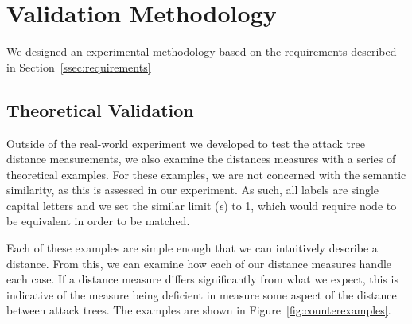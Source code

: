 \section{Validation Methodology}
\label{sec:methodology}

We designed an experimental methodology based on the requirements described in Section~\ref{ssec:requirements}





\subsection{Theoretical Validation}
\label{ssec:methodology-examples}


Outside of the real-world experiment we developed to test the attack tree distance measurements, we also examine the distances measures with a series of theoretical examples. For these examples, we are not concerned with the semantic similarity,  as this is assessed in our experiment. As such, all labels are single capital letters and we set the similar limit ($\epsilon$) to 1, which would require node to be equivalent in order to be matched.

Each of these examples are simple enough that we can intuitively describe a distance. From this, we can examine how each of our distance measures handle each case. If a distance measure differs significantly from what we expect, this is indicative of the measure being deficient in measure some aspect of the distance between attack trees. The examples are shown in Figure~\ref{fig:counterexamples}.


